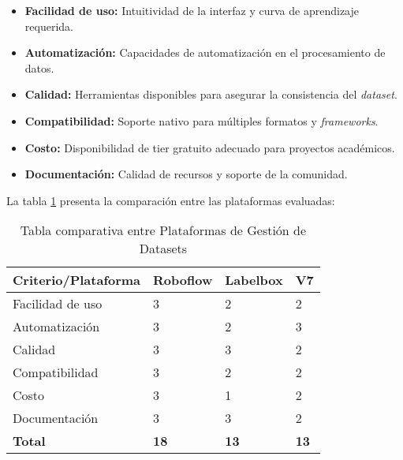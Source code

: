 \begin{itemize}
    \item \textbf{Facilidad de uso:} Intuitividad de la interfaz y curva de aprendizaje requerida.
    \item \textbf{Automatización:} Capacidades de automatización en el procesamiento de datos.
    \item \textbf{Calidad:} Herramientas disponibles para asegurar la consistencia del \textit{dataset}.
    \item \textbf{Compatibilidad:} Soporte nativo para múltiples formatos y \textit{frameworks}.
    \item \textbf{Costo:} Disponibilidad de tier gratuito adecuado para proyectos académicos.
    \item \textbf{Documentación:} Calidad de recursos y soporte de la comunidad.
\end{itemize}

La tabla \ref{fig:Elec_Dataset} presenta la comparación entre las plataformas evaluadas:

\begin{table}[H]
\centering
\renewcommand{\arraystretch}{1.2}
\caption{Tabla comparativa entre Plataformas de Gestión de Datasets}
\label{fig:Elec_Dataset}
\begin{tabular}{|p{4.5cm}|p{2.2cm}|p{2.2cm}|p{2.2cm}|}
\hline
\textbf{Criterio/Plataforma}     & \textbf{Roboflow} & \textbf{Labelbox} & \textbf{V7} \\ \hline
Facilidad de uso                & 3                 & 2                 & 2           \\ \hline
Automatización                  & 3                 & 2                 & 3           \\ \hline
Calidad                         & 3                 & 3                 & 2           \\ \hline
Compatibilidad                  & 3                 & 2                 & 2           \\ \hline
Costo                           & 3                 & 1                 & 2           \\ \hline
Documentación                   & 3                 & 3                 & 2           \\ \hline
\textbf{Total}                  & \textbf{18}       & \textbf{13}       & \textbf{13} \\ \hline
\end{tabular}
\end{table}

